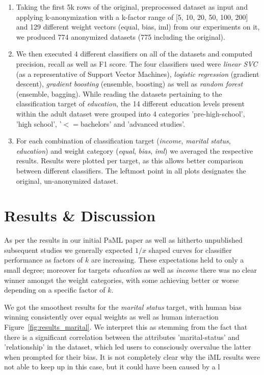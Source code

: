 \documentclass{llncs}
\begin{document}
\begin{enumerate}
	\item Taking the first 5k rows of the original, preprocessed dataset as input and applying k-anonymization with a k-factor range of [5, 10, 20, 50, 100, 200] and 129 different weight vectors (equal, bias, iml) from our experiments on it, we produced 774 anonymized datasets (775 including the original).
	\item We then executed 4 different classifiers on all of the datasets and computed precision, recall as well as F1 score. The four classifiers used were \textit{linear SVC} (as a representative of Support Vector Machines), \textit{logistic regression} (gradient descent), \textit{gradient boosting} (ensemble, boosting) as well as \textit{random forest} (ensemble, bagging). While reading the datasets pertaining to the classification target of \textit{education}, the 14 different education levels present within the adult dataset were grouped into 4 categories 'pre-high-school', 'high school', '$<=$bachelors' and 'advanced studies'.
	\item For each combination of classification target (\textit{income}, \textit{marital status}, \textit{education}) and weight category (\textit{equal}, \textit{bias}, \textit{iml}) we averaged the respective results. Results were plotted per target, as this allows better comparison between different classifiers. The leftmost point in all plots designates the original, un-anonymized dataset.
\end{enumerate}


\section{Results \& Discussion}
\label{sect:results}

As per the results in our initial PaML paper \cite{malle2016right} as well as hitherto unpublished subsequent studies we generally expected $1/x$ shaped curves for classifier performance as factors of $k$ are increasing. These expectations held to only a small degree; moreover for targets \textit{education} as well as \textit{income} there was no clear winner amongst the weight categories, with some achieving better or worse depending on a specific factor of $k$.

We got the smoothest results for the \textit{marital status} target, with human bias winning consistently over equal weights as well as human interaction Figure~\ref{fig:results_marital}. We interpret this as stemming from the fact that there is a significant correlation between the attributes 'marital-status' and 'relationship' in the dataset, which led users to consciously overvalue the latter when prompted for their bias. It is not completely clear why the iML results were not able to keep up in this case, but it could have been caused by a l
\end{document}
